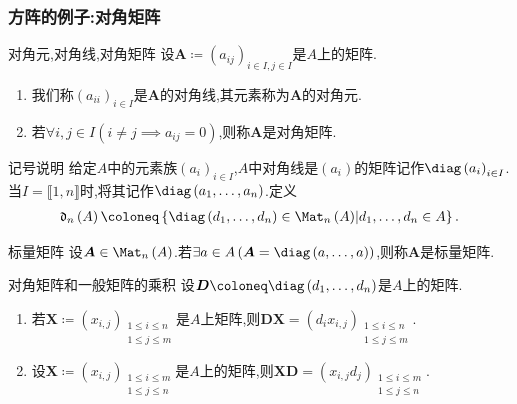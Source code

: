 \subsubsection*{方阵的例子:对角矩阵}

\begin{definition}{对角元,对角线,对角矩阵}{}
	设$\boldsymbol{A}\coloneq\left(a_{ij}\right)_{i\in I,j\in I}$是$A$上的矩阵.
	\begin{enumerate}
		\item 我们称$\left(a_{ii}\right)_{i\in I}$是$\boldsymbol{A}$的对角线,其元素称为$\boldsymbol{A}$的对角元.
		\item 若$\forall i,j\in I\left(i\neq j\implies a_{ij}=0\right)$,则称$\boldsymbol{A}$是对角矩阵.
	\end{enumerate}
\end{definition}

\begin{remark}{记号说明}{}
	给定$A$中的元素族$\left(a_{i}\right)_{i\in I}$,$A$中对角线是$\left(a_{i}\right)$的矩阵记作$\diag\left(a_{i}\right)_{i\in I}$.当$I=\llbracket 1,n\rrbracket$时,将其记作$\diag\left(a_{1},\ldots,a_{n}\right)$.定义
	\begin{align*}
		\mathfrak{d}_{n}\left(A\right)\coloneq\left\{\diag\left(d_{1},\ldots,d_{n}\right)\in\Mat_{n}\left(A\right)\middle|d_{1},\ldots,d_{n}\in A\right\}.
	\end{align*}
\end{remark}

\begin{definition}{标量矩阵}{}
	设$\boldsymbol{A}\in\Mat_{n}\left(A\right)$.若$\exists a\in A\left(\boldsymbol{A}=\diag\left(a,\ldots,a\right)\right)$,则称$\boldsymbol{A}$是标量矩阵.
\end{definition}

\begin{proposition}{对角矩阵和一般矩阵的乘积}{}
	设$\boldsymbol{D}\coloneq\diag\left(d_{1},\ldots,d_{n}\right)$是$A$上的矩阵.
	\begin{enumerate}
		\item 若$\boldsymbol{X}\coloneq\left(x_{i,j}\right)_{\substack{1\leqslant i\leqslant n\\1\leqslant j\leqslant m}}$是$A$上矩阵,则$\boldsymbol{D}\boldsymbol{X}=\left(d_{i}x_{i,j}\right)_{\substack{1\leqslant i\leqslant n\\1\leqslant j\leqslant m}}$.
		\item 设$\boldsymbol{X}\coloneq\left(x_{i,j}\right)_{\substack{1\leqslant i\leqslant m\\1\leqslant j\leqslant n}}$是$A$上的矩阵,则$\boldsymbol{X}\boldsymbol{D}=\left(x_{i,j}d_{j}\right)_{\substack{1\leqslant i\leqslant m\\1\leqslant j\leqslant n}}$.
	\end{enumerate}
\end{proposition}

